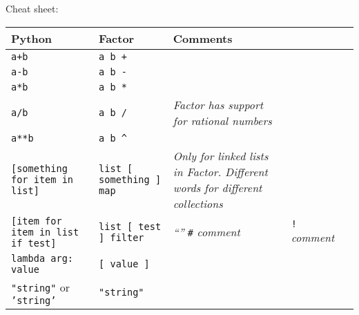 \documentclass{article}
\begin{document}
Cheat sheet:

\begin{tabular}{|l|lp{3.5cm}|lp{4cm}|} \hline
Python & Factor & Comments\\ \hline
\texttt{a+b} & \texttt{a b +} &\\
\texttt{a-b} & \texttt{a b -} &\\
\texttt{a*b} & \texttt{a b *} &\\
\texttt{a/b} & \texttt{a b /} & \emph{Factor has support for rational numbers}\\
\verb|a**b| & \texttt{a b \^} & \\
\texttt{[something for item in list]} & \texttt{list [ something ] map} & \emph{Only for linked lists in Factor. Different words for different collections}\\
\texttt{[item for item in list if test]} & \texttt{list [ test ] filter} & \emph{``''}
\texttt{\#} \emph{comment} & \texttt{! } \emph{comment} &\\
\texttt{lambda arg: value} & \texttt{[ value ]} &\\
\texttt{"string"} or \texttt{'string'} & \texttt{"string"} &\\
\hline
\end{tabular}
\end{document}
